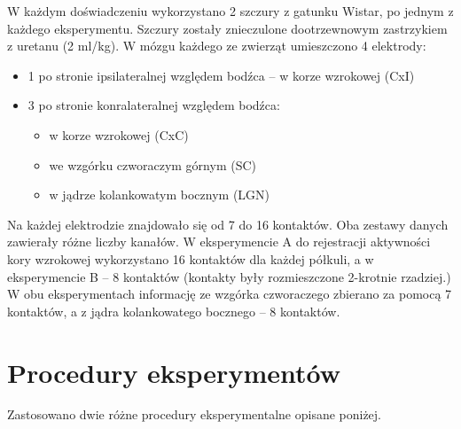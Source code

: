 \documentclass{pracamgr_2}
\begin{document}
W każdym doświadczeniu wykorzystano 2 szczury z gatunku Wistar, po jednym z każdego eksperymentu. Szczury zostały znieczulone dootrzewnowym zastrzykiem z uretanu (2 ml/kg). W mózgu każdego ze zwierząt umieszczono 4 elektrody:
\begin{itemize}
	\item 1 po stronie ipsilateralnej względem bodźca -- w korze wzrokowej (CxI)
	\item 3 po stronie konralateralnej względem bodźca:
	\begin{itemize}
		\item w korze wzrokowej (CxC)
		\item we wzgórku czworaczym górnym (SC)
		\item w jądrze kolankowatym bocznym (LGN)
	\end{itemize}
\end{itemize}
Na każdej elektrodzie znajdowało się od 7 do 16 kontaktów. Oba zestawy danych zawierały różne liczby kanałów. W eksperymencie A do rejestracji aktywności kory wzrokowej wykorzystano 16 kontaktów dla każdej półkuli, a w eksperymencie B -- 8 kontaktów (kontakty były rozmieszczone 2-krotnie rzadziej.) W obu eksperymentach informację ze wzgórka czworaczego zbierano za pomocą 7 kontaktów, a z jądra kolankowatego bocznego -- 8 kontaktów. 
\section{Procedury eksperymentów}
Zastosowano dwie różne procedury eksperymentalne opisane poniżej.
\end{document}
